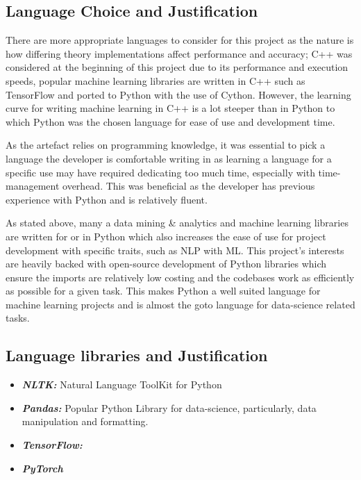 \subsection{Language Choice and Justification}

There are more appropriate languages to consider for this project as the nature is how differing theory implementations affect performance and accuracy; C++ was considered at the beginning of this project due to its performance and execution speeds, popular machine learning libraries are written in C++ such as TensorFlow and ported to Python with the use of Cython. However, the learning curve for writing machine learning in C++ is a lot steeper than in Python to which Python was the chosen language for ease of use and development time.

As the artefact relies on programming knowledge, it was essential to pick a language the developer is comfortable writing in as learning a language for a specific use may have required dedicating too much time, especially with time-management overhead. This was beneficial as the developer has previous experience with Python and is relatively fluent.

As stated above, many a data mining \& analytics and machine learning libraries are written for or in Python which also increases the ease of use for project development with specific traits, such as NLP with ML. This project's interests are heavily backed with open-source development of Python libraries which ensure the imports are relatively low costing and the codebases work as efficiently as possible for a given task. This makes Python a well suited language for machine learning projects and is almost the goto language for data-science related tasks. \newpage

\subsection{Language libraries and Justification}

\begin{itemize}
    \item \textbf{\textit{NLTK:}} Natural Language ToolKit for Python
    \item \textbf{\textit{Pandas:}} Popular Python Library for data-science, particularly, data manipulation and formatting.
    \item \textbf{\textit{TensorFlow:}}
    \item \textbf{\textit{PyTorch}}
\end{itemize}

